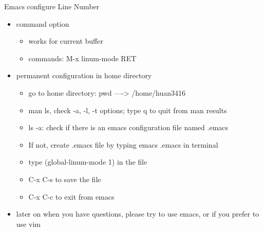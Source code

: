 \documentclass[presentation]{beamer}
\begin{document}
\begin{frame}[label=sec-9]{Emacs configure \alert{Line Number}}
\begin{itemize}
\item command option
\begin{itemize}
\item works for current buffer
\item commands: \alert{M-x linum-mode RET}
\end{itemize}
\item permanent configuration in home directory
\begin{itemize}
\item go to home directory: \alert{pwd} ----> \alert{/home/huan3416}
\item \alert{man ls}, check \alert{-a}, \alert{-l}, \alert{-t} options; type \alert{q} to quit from \alert{man} results
\item \alert{ls -a}: check if there is an emacs configuration file named \alert{.emacs}
\item If not, create \alert{.emacs} file by typing \alert{emacs .emacs} in terminal
\item type \alert{(global-linum-mode 1)} in the file
\item \alert{C-x C-s} to \alert{save} the file
\item \alert{C-x C-c} to \alert{exit} from emacs
\end{itemize}
\item later on when you have questions, please try to use \alert{emacs}, or if you prefer to use \alert{vim}
\end{itemize}
\end{frame}
\end{document}
